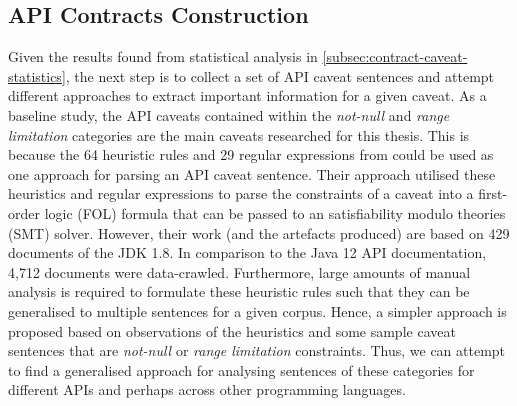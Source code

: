 \subsection{API Contracts Construction}
Given the results found from statistical analysis in \ref{subsec:contract-caveat-statistics}, the next step is to collect a set of API caveat sentences and attempt different approaches to extract important information for a given caveat. As a baseline study, the API caveats contained within the \textit{not-null} and \textit{range limitation} categories are the main caveats researched for this thesis. This is because the 64 heuristic rules and 29 regular expressions from \cite{zhou-directive} could be used as one approach for parsing an API caveat sentence. Their approach utilised these heuristics and regular expressions to parse the constraints of a caveat into a first-order logic (FOL) formula that can be passed to an satisfiability modulo theories (SMT) solver. However, their work (and the artefacts produced) are based on 429 documents of the JDK 1.8. In comparison to the Java 12 API documentation, 4,712 documents were data-crawled. Furthermore, large amounts of manual analysis is required to formulate these heuristic rules such that they can be generalised to multiple sentences for a given corpus. Hence, a simpler approach is proposed based on observations of the heuristics and some sample caveat sentences that are \textit{not-null} or \textit{range limitation} constraints. Thus, we can attempt to find a generalised approach for analysing sentences of these categories for different APIs and perhaps across other programming languages. \\

